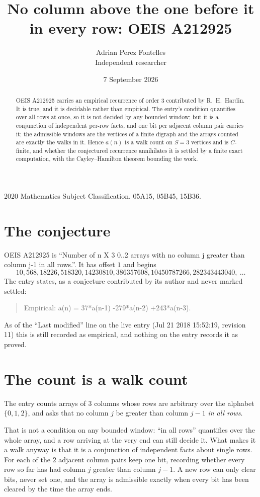 \documentclass[11pt,a4paper]{article}
\title{No column above the one before it in every row: OEIS A212925}
\author{Adrian Perez Fontelles\\ \small Independent researcher}
\date{7 September 2026}
\theoremstyle{plain}
\theoremstyle{definition}
\begin{document}
\maketitle

\begin{abstract}
OEIS A212925 carries an empirical recurrence of order $3$ contributed by R.~H.~Hardin. It is
true, and it is decidable rather than empirical. The entry's condition quantifies over all rows at once, so it is not decided by any
bounded window; but it is a conjunction of independent per-row facts, and one bit per
adjacent column pair carries it; the
admissible windows are the vertices of a finite digraph and the arrays counted are exactly the
walks in it. Hence $a(n)$ is a walk count on $S=3$ vertices and is $C$-finite, and whether the
conjectured recurrence annihilates it is settled by a finite exact computation, with the
Cayley--Hamilton theorem bounding the work.
\end{abstract}

\noindent\small 2020 Mathematics Subject Classification. 05A15, 05B45, 15B36.\normalsize

\section{The conjecture}

OEIS A212925 is ``Number of n X 3 0..2 arrays with no column j greater than column j-1 in all rows.''. It has offset $1$ and begins
\[
10, 568, 18226, 518320, 14230810, 386357608, 10450787266, 282343443040,\ \dots
\]
The entry states, as a conjecture contributed by its author and never marked settled:
\begin{quote}
Empirical: a(n) = 37*a(n-1) -279*a(n-2) +243*a(n-3).
\end{quote}
As of the ``Last modified'' line on the live entry (Jul 21 2018 15:52:19, revision 11) this is still
recorded as empirical, and nothing on the entry records it as proved.

\section{The count is a walk count}

The entry counts arrays of $3$ columns whose rows are arbitrary over the alphabet $\{0,1,2\}$, and asks that no column $j$ be greater than column $j-1$ \emph{in all rows}.

That is not a condition on any bounded window: ``in all rows'' quantifies over the whole array, and a row arriving at the very end can still decide it. What makes it a walk anyway is that it is a conjunction of independent facts about single rows. For each of the $2$ adjacent column pairs keep one bit, recording whether every row so far has had column $j$ greater than column $j-1$. A new row can only clear bits, never set one, and the array is admissible exactly when every bit has been cleared by the time the array ends.
\end{document}
